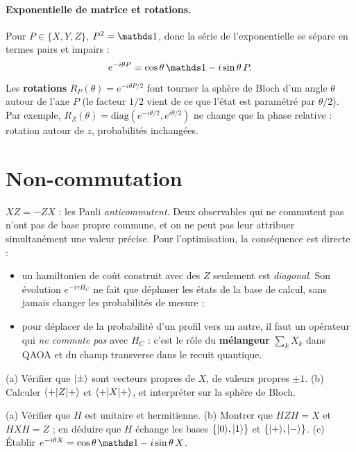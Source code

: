 \paragraph{Exponentielle de matrice et rotations.} Pour $P\in\{X,Y,Z\}$, $P^2=\Id$, donc la série de l'exponentielle se sépare en termes pairs et impairs :
\[
e^{-i\theta P}=\cos\theta\,\Id-i\sin\theta\,P .
\]
Les \textbf{rotations} $R_P(\theta)=e^{-i\theta P/2}$ font tourner la sphère de Bloch d'un angle $\theta$ autour de l'axe $P$ (le facteur $1/2$ vient de ce que l'état est paramétré par $\theta/2$). Par exemple, $R_Z(\theta)=\mathrm{diag}(e^{-i\theta/2},e^{i\theta/2})$ ne change que la phase relative : rotation autour de $z$, probabilités inchangées.

\section{Non-commutation}
$XZ=-ZX$ : les Pauli \emph{anticommutent}. Deux observables qui ne commutent pas n'ont pas de base propre commune, et on ne peut pas leur attribuer simultanément une valeur précise. Pour l'optimisation, la conséquence est directe :
\begin{itemize}
\item un hamiltonien de coût construit avec des $Z$ seulement est \emph{diagonal}. Son évolution $e^{-i\gamma H_C}$ ne fait que déphaser les états de la base de calcul, sans jamais changer les probabilités de mesure ;
\item pour déplacer de la probabilité d'un profil vers un autre, il faut un opérateur qui \emph{ne commute pas} avec $H_C$ : c'est le rôle du \textbf{mélangeur} $\sum_kX_k$ dans QAOA et du champ transverse dans le recuit quantique.
\end{itemize}

\exercices
\begin{exercice}
(a) Vérifier que $\lvert \pm\rangle$ sont vecteurs propres de $X$, de valeurs propres $\pm1$. (b) Calculer $\langle +\rvert Z\lvert +\rangle$ et $\langle +\rvert X\lvert +\rangle$, et interpréter sur la sphère de Bloch.
\end{exercice}
\begin{exercice}
(a) Vérifier que $H$ est unitaire et hermitienne. (b) Montrer que $HZH=X$ et $HXH=Z$ ; en déduire que $H$ échange les bases $\{\lvert 0\rangle,\lvert 1\rangle\}$ et $\{\lvert +\rangle,\lvert -\rangle\}$. (c) Établir $e^{-i\theta X}=\cos\theta\,\Id-i\sin\theta\,X$.
\end{exercice}
